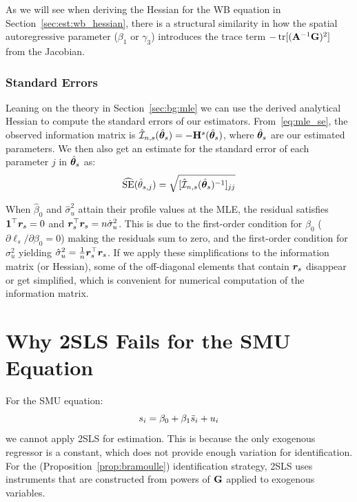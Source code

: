 As we will see when deriving the Hessian for the WB equation in Section~\ref{sec:est:wb_hessian}, there is a structural similarity in how the spatial autoregressive parameter ($\beta_1$ or $\gamma_3$) introduces the trace term $-\operatorname{tr}[(\mathbf{A}^{-1}\mathbf{G})^2]$ from the Jacobian.

\subsubsection{Standard Errors}

Leaning on the theory in Section~\ref{sec:bg:mle} we can use the derived analytical Hessian to compute the standard errors of our estimators. From~\eqref{eq:mle_se}, the observed information matrix is $\hat{\mathcal{I}}_{n,s}(\hat{\bm{\theta}}_s) = -\mathbf{H}^s(\hat{\bm{\theta}}_s)$, where $\hat{\bm{\theta}}_s$ are our estimated parameters. We then also get an estimate for the standard error of each parameter $j$ in $\hat{\bm{\theta}}_s$ as:
\begin{equation}
    \widehat{\text{SE}}(\hat\theta_{s,j}) = \sqrt{[\hat{\mathcal{I}}_{n,s}(\hat{\bm{\theta}}_s)^{-1}]_{jj}}
\end{equation}

When $\hat{\beta}_0$ and $\hat{\sigma}_u^2$ attain their profile values at the MLE, the residual satisfies $\bm{1}^\top\bm{r}_s = 0$ and $\bm{r}_s^\top\bm{r}_s = n\hat{\sigma}_u^2$. This is due to the first-order condition for $\beta_0$ ($\partial \ell_s / \partial \beta_0 = 0$) making the residuals sum to zero, and the first-order condition for $\sigma_u^2$ yielding $\hat{\sigma}_u^2 = \frac{1}{n}\bm{r}_s^\top\bm{r}_s$. If we apply these simplifications to the information matrix (or Hessian), some of the off-diagonal elements that contain $\bm{r}_s$ disappear or get simplified, which is convenient for numerical computation of the information matrix.

\section{Why 2SLS Fails for the SMU Equation}
\label{sec:est:screen_2sls}
For the SMU equation:
\begin{equation}
    s_i = \beta_0 + \beta_1\bar{s}_i + u_i
\end{equation}
we cannot apply 2SLS for estimation. This is because the only exogenous regressor is a constant, which does not provide enough variation for identification. For the \textcite{Bramoulle2009} (Proposition~\ref{prop:bramoulle}) identification strategy, 2SLS uses instruments that are constructed from powers of $\mathbf{G}$ applied to exogenous variables.

